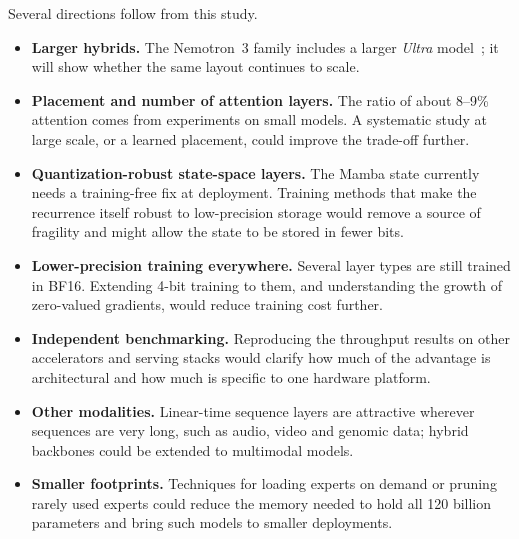 Several directions follow from this study.
\begin{itemize}
  \item \textbf{Larger hybrids.} The Nemotron~3 family includes a larger
        \emph{Ultra} model~\cite{nvidia2025nemotron3}; it will show whether the
        same layout continues to scale.
  \item \textbf{Placement and number of attention layers.} The ratio of about
        8--9\% attention comes from experiments on small models. A systematic
        study at large scale, or a learned placement, could improve the
        trade-off further.
  \item \textbf{Quantization-robust state-space layers.} The Mamba state
        currently needs a training-free fix at deployment. Training methods
        that make the recurrence itself robust to low-precision storage would
        remove a source of fragility and might allow the state to be stored in
        fewer bits.
  \item \textbf{Lower-precision training everywhere.} Several layer types are
        still trained in BF16. Extending 4-bit training to them, and
        understanding the growth of zero-valued gradients, would reduce
        training cost further.
  \item \textbf{Independent benchmarking.} Reproducing the throughput results
        on other accelerators and serving stacks would clarify how much of the
        advantage is architectural and how much is specific to one hardware
        platform.
  \item \textbf{Other modalities.} Linear-time sequence layers are attractive
        wherever sequences are very long, such as audio, video and genomic
        data; hybrid backbones could be extended to multimodal models.
  \item \textbf{Smaller footprints.} Techniques for loading experts on demand
        or pruning rarely used experts could reduce the memory needed to hold
        all 120 billion parameters and bring such models to smaller
        deployments.
\end{itemize}
